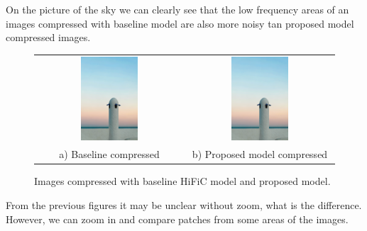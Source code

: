 On the picture of the sky we can clearly see that the low frequency areas of an images compressed with baseline model are also more noisy tan proposed model compressed images.

\begin{figure}[!ht]
    \centering
    \begin{tabular}{cc}
        \includegraphics[width=0.4\textwidth]{figure/sky-recon-full.png} & \includegraphics[width=0.4\textwidth]{figure/sky-recon-denoise-full.png} \\
        a) Baseline compressed                                           & b) Proposed model compressed
    \end{tabular}
    \caption{Images compressed with baseline HiFiC model and proposed model.}
    \label{compressed-sky}
\end{figure}

From the previous figures it may be unclear without zoom, what is the difference. However, we can zoom in and compare patches from some areas of the images.

